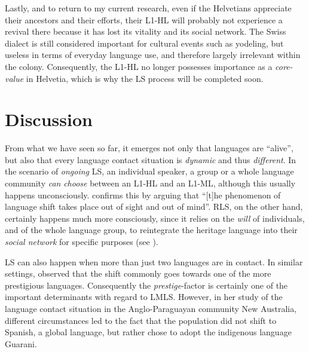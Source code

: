 \documentclass[output=paper]{langscibook}
\begin{document}
Lastly, and to return to my current research, even if the Helvetians appreciate their ancestors and their efforts, their L1-HL will probably not experience a revival there because it has lost its vitality and its social network. The Swiss dialect is  still considered important for cultural events such as yodeling, but useless in terms of everyday language use, and therefore largely irrelevant within the colony. Consequently, the L1-HL no longer possesses importance as a \emph{core-value} in Helvetia, which is why the LS process will be completed soon.

\section{Discussion}
\label{discussion}

From what we have seen so far, it emerges not only that languages are ``alive'', but also that every language contact situation is \emph{dynamic} and thus \emph{different}. In the scenario of \emph{ongoing} LS, an individual speaker, a group or a whole language community \emph{can} \emph{choose} between an L1-HL and an L1-ML, although this usually happens unconsciously. \textcite[para. 8]{Buda1992} confirms this by arguing that ``{[}t{]}he phenomenon of language shift takes place out of sight and out of mind''. RLS, on the other hand, certainly happens much more consciously, since it relies on the \emph{will} of  individuals, and of the whole language group, to reintegrate the heritage language into their \emph{social network} for specific purposes (see ).

LS can also happen when more than just two languages are in contact. In similar settings, \textcite{Perez2016} observed that the shift commonly goes towards one of the more prestigious languages. Consequently the \emph{prestige}-factor is certainly one of the important determinants with regard to LMLS. However, in her study of the language contact situation in the Anglo-Paraguayan community New Australia, different circumstances led to the fact that the population did not shift to Spanish, a global language, but rather chose to adopt the indigenous language Guarani. 
\end{document}
